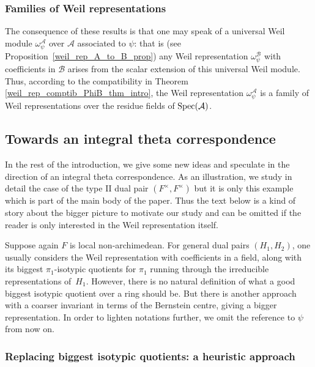 \documentclass[11pt]{article}
\theoremstyle{plain}
\theoremstyle{definition}
\theoremstyle{plain}
\theoremstyle{definition}
\theoremstyle{plain}
\begin{document}
\subsubsection*{Families of Weil representations}

The consequence of these results is that one may speak of a universal Weil module $\omega_\psi^\mathcal{A}$ over $\mathcal{A}$ associated to $\psi$: that is (see Proposition~\ref{weil_rep_A_to_B_prop}) any Weil representation $\omega_\psi^\mathcal{B}$ with coefficients in $\mathcal{B}$ arises from the scalar extension of this universal Weil module. Thus, according to the compatibility in Theorem \ref{weil_rep_comptib_PhiB_thm_intro}, the Weil representation $\omega_\psi^\mathcal{A}$ is a family of Weil representations over the residue fields of $\textup{Spec}(\mathcal{A})$.



\subsection{Towards an integral theta correspondence}

In the rest of the introduction, we give some new ideas and speculate in the direction of an integral theta correspondence. As an illustration, we study in detail the case of the type II dual pair $(F^\times,F^\times)$ but it is only this example which is part of the main body of the paper. Thus the text below is a kind of story about the bigger picture to motivate our study and can be omitted if the reader is only interested in the Weil representation itself.

Suppose again $F$ is local non-archimedean. For %
general dual pairs $(H_1,H_2)$, one usually considers the Weil representation with coefficients in a field, along with its biggest $\pi_1$-isotypic quotients for $\pi_1$ running through the irreducible representations of~$H_1$. However, there is no  natural definition of what a good biggest isotypic quotient over a ring should be. But there is another approach with a coarser invariant in terms of the Bernstein centre, giving a bigger representation. In order to lighten notations further, we omit the reference to $\psi$ from now on.

\subsubsection*{Replacing biggest isotypic quotients: a heuristic approach}
\end{document}
